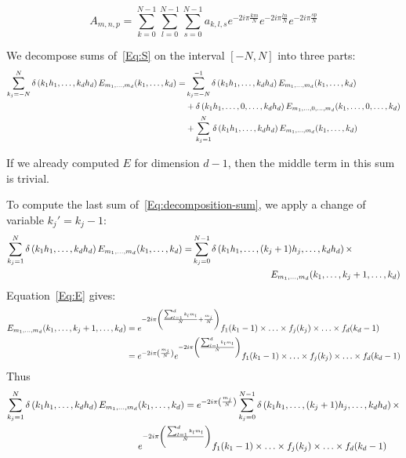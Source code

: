 {  $$
  A_{m,n,p} = \sum_{k=0}^{N-1}\sum_{l=0}^{N-1}\sum_{s=0}^{N-1} a_{k,l,s} e^{-2i\pi\frac{km}{N}} e^{-2i\pi\frac{ln}{N}} e^{-2i\pi\frac{sp}{N}}
  $$

  We decompose sums of~\eqref{Eq:S} on the interval $[-N,N]$ into three parts:
  \begin{align}
  \sum_{k_j=-N}^{N}\delta\left(k_1h_1,\hdots,k_dh_d\right) E_{m_1,\hdots,m_d}(k_1,\hdots,k_d)
    = & \sum_{k_j=-N}^{-1} \delta\left(k_1h_1,\hdots,k_dh_d\right) E_{m_1,\hdots,m_d}(k_1,\hdots,k_d) \notag\\
    & + \delta\left(k_1h_1,\hdots,0,\hdots,k_dh_d\right) E_{m_1,\hdots,0,\hdots,m_d}(k_1,\hdots,0,\hdots,k_d) \notag\\
    & + \sum_{k_j=1}^{N}\delta\left(k_1h_1,\hdots,k_dh_d\right) E_{m_1,\hdots,m_d}(k_1,\hdots,k_d) \label{Eq:decomposition-sum}
  \end{align}

  If we already computed $E$ for dimension $d-1$, then the middle term in this sum is trivial.

  To compute the last sum of~\eqref{Eq:decomposition-sum}, we apply a change of variable $k_j'=k_j-1$:
  \begin{align}
  \sum_{k_j=1}^{N}\delta\left(k_1h_1,\hdots,k_dh_d\right) E_{m_1,\hdots,m_d}(k_1,\hdots,k_d)
  = & \sum_{k_j=0}^{N-1}\delta\left(k_1h_1,\hdots,(k_j+1)h_j,\hdots,k_dh_d\right) \times\notag\\
    & \hspace*{3cm} E_{m_1,\hdots,m_d}(k_1,\hdots,k_j+1,\hdots,k_d)
  \end{align}
  Equation~\eqref{Eq:E} gives:
  \begin{align}
  E_{m_1,\hdots,m_d}(k_1,\hdots,k_j+1,\hdots,k_d) 
  &= 
      e^{-2i\pi\left(\frac{\sum_{l=1}^{d}k_l m_l}{N} +\frac{m_j}{N}\right)}
      f_1(k_1-1)\times\hdots\times f_j(k_j)\times\hdots\times f_d(k_d-1)\notag\\
  &= 
      e^{-2i\pi\left(\frac{m_j}{N}\right)}
      e^{-2i\pi\left(\frac{\sum_{l=1}^{d}k_l m_l}{N}\right)}
      f_1(k_1-1)\times\hdots\times f_j(k_j)\times\hdots\times f_d(k_d-1)
  \end{align}
  Thus
  \begin{align}
  \sum_{k_j=1}^{N}\delta\left(k_1h_1,\hdots,k_dh_d\right) E_{m_1,\hdots,m_d}&(k_1,\hdots,k_d)
    = e^{-2i\pi\left(\frac{m_j}{N}\right)} \sum_{k_j=0}^{N-1}\delta\left(k_1h_1,\hdots,(k_j+1)h_j,\hdots,k_dh_d\right) \times\notag\\
    & e^{-2i\pi\left(\frac{\sum_{l=1}^{d}k_l m_l}{N}\right)}
      f_1(k_1-1)\times\hdots\times f_j(k_j)\times\hdots\times f_d(k_d-1) \label{Eq:j-sigma+}
  \end{align}

}

